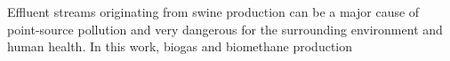 Effluent streams originating from swine production can be a major cause of point-source pollution and very dangerous for the surrounding environment and human health. In this work, biogas and biomethane production 